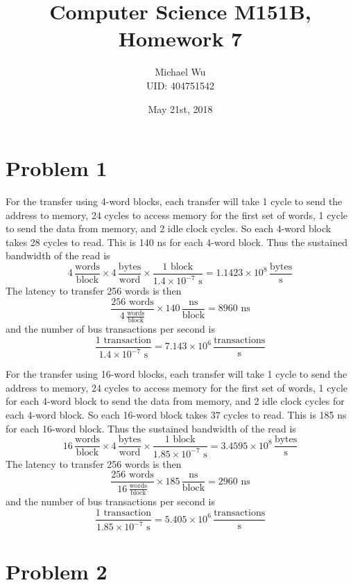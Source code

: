 \documentclass[12pt]{article}
\begin{document}
\title{Computer Science M151B, Homework 7}
\date{May 21st, 2018}
\author{Michael Wu\\UID: 404751542}
\maketitle

\section*{Problem 1}

For the transfer using 4-word blocks, each transfer will take 1 cycle to send the address to memory, 24 cycles to access memory for the first
set of words, 1 cycle to send the data from memory, and 2 idle clock cycles. So each 4-word block takes 28 cycles to read. This is 140 ns for each
4-word block. Thus the sustained bandwidth of the read is
\[4\,\frac{\text{words}}{\text{block}}\times 4\,\frac{\text{bytes}}{\text{word}}\times \frac{1 \text{ block}}{1.4 \times 10^{-7} \text{ s}}
=1.1423 \times 10^8\,\frac{\text{bytes}}{\text{s}}\]
The latency to transfer 256 words is then
\[\frac{256 \text{ words}}{4\,\frac{\text{words}}{\text{block}}}\times 140\,\frac{\text{ns}}{\text{block}}=8960 \text{ ns}\]
and the number of bus transactions per second is
\[\frac{1 \text{ transaction}}{1.4 \times 10^{-7} \text{ s}}=7.143 \times 10^{6}\,\frac{\text{transactions}}{\text{s}}\]

For the transfer using 16-word blocks, each transfer will take 1 cycle to send the address to memory, 24 cycles to access memory for the first
set of words, 1 cycle for each 4-word block to send the data from memory, and 2 idle clock cycles for each 4-word block. So each 16-word block
takes 37 cycles to read. This is 185 ns for each
16-word block. Thus the sustained bandwidth of the read is
\[16\,\frac{\text{words}}{\text{block}}\times 4\,\frac{\text{bytes}}{\text{word}}\times \frac{1 \text{ block}}{1.85 \times 10^{-7} \text{ s}}
=3.4595 \times 10^8\,\frac{\text{bytes}}{\text{s}}\]
The latency to transfer 256 words is then
\[\frac{256 \text{ words}}{16\,\frac{\text{words}}{\text{block}}}\times 185\,\frac{\text{ns}}{\text{block}}=2960 \text{ ns}\]
and the number of bus transactions per second is
\[\frac{1 \text{ transaction}}{1.85 \times 10^{-7} \text{ s}}=5.405 \times 10^{6}\,\frac{\text{transactions}}{\text{s}}\]

\section*{Problem 2}
\end{document}
